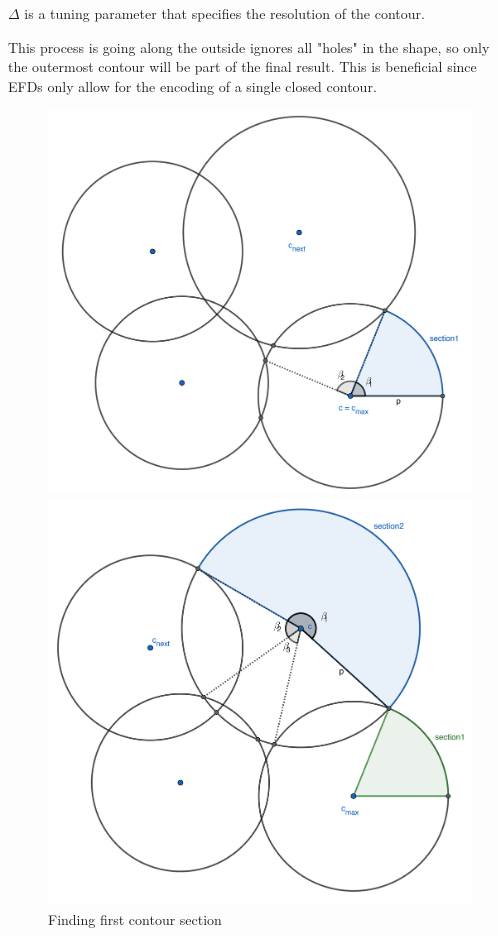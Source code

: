 $\Delta$ is a tuning parameter that specifies the resolution of the contour.

This process is going along the outside ignores all "holes" in the shape, so only the outermost contour will be part of the final result. 
This is beneficial since EFDs only allow for the encoding of a single closed contour.

\begin{figure}[H]
    \includegraphics[width=1.0\textwidth]{figures/contour/c1copy.pdf}
    \caption{Finding first contour section}
  \endminipage\hfill
    \includegraphics[width=1.0\textwidth]{figures/contour/c2copy.pdf}

\end{figure}
